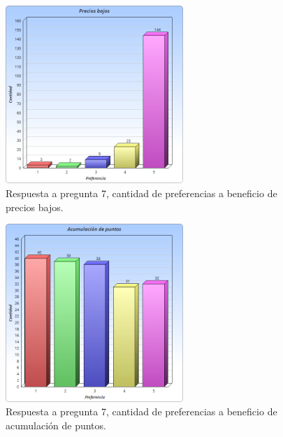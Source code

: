 \begin{figure}[!htb]
  \centering
  \includegraphics[width=0.6\textwidth]{images/Graficos/graf_5_5.png}
  \caption[chart5.5]{Respuesta a pregunta 7, cantidad de preferencias a beneficio de precios bajos.}
  \label{fig:chart5.5}
\end{figure}

\begin{figure}[!htb]
  \centering
  \includegraphics[width=0.6\textwidth]{images/Graficos/graf_5_6.png}
  \caption[chart5.6]{Respuesta a pregunta 7, cantidad de preferencias a beneficio de acumulación de puntos.}
  \label{fig:chart5.6}
\end{figure}

